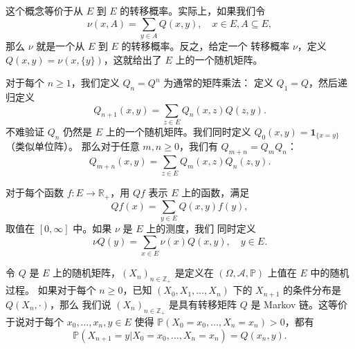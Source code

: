 \documentclass[fontset=none]{Notes}
\newcommand{\indicator}[1]{\mathbold 1_{#1}}
\begin{document}
这个概念等价于从 $E$ 到 $E$ 的转移概率。实际上，如果我们令
\[
  \nu(x,A)=\sum_{y\in A}Q(x,y),\quad x\in E,A\subseteq E,  
\]
那么 $\nu$ 就是一个从 $E$ 到 $E$ 的转移概率。反之，给定一个
转移概率 $\nu$，定义 $Q(x,y)=\nu(x,\{y\})$，这就给出了 
$E$ 上的一个随机矩阵。

对于每个 $n\geq 1$，我们定义 $Q_n=Q^n$ 为通常的矩阵乘法：
定义 $Q_1=Q$，然后递归定义
\[
  Q_{n+1}(x,y)=\sum_{z\in E}Q_n(x,z)Q(z,y).  
\]
不难验证 $Q_n$ 仍然是 $E$ 上的一个随机矩阵。我们同时定义
$Q_0(x,y)=\indicator{\{x=y\}}$（类似单位阵）。
那么对于任意 $m,n\geq 0$，我们有 $Q_{m+n}=Q_mQ_n$：
\[
  Q_{m+n}(x,y)=\sum_{z\in E}Q_m(x,z)Q_n(z,y).  
\]

对于每个函数 $f:E\to \mathbb{R}_+$，用 $Qf$ 表示 $E$
上的函数，满足
\[
  Qf(x)=\sum_{y\in E}Q(x,y)f(y),  
\]
取值在 $[0,\infty]$ 中。如果 $\nu$ 是 $E$ 上的测度，我们
同时定义
\[
  \nu Q(y)=\sum_{x\in E}\nu(x)Q(x,y),\quad y\in E.  
\]

\begin{definition}
  令 $Q$ 是 $E$ 上的随机矩阵，$(X_n)_{n\in \mathbb{Z}_+}$
  是定义在 $(\Omega,\mathcal{A},\mathbb{P})$ 上值在 $E$ 中的随机过程。
  如果对于每个 $n\geq 0$，已知 $(X_0,X_1,\dots,X_n)$ 下的
  $X_{n+1}$ 的条件分布是 $Q(X_n,\cdot)$，那么 
  我们说 $(X_n)_{n\in \mathbb{Z}_+}$ 是具有转移矩阵 $Q$
  是 Markov 链。这等价于说对于每个 $x_0,\dots,x_n,y\in E$
  使得 $\mathbb{P}(X_0=x_0,\dots,X_n=x_n)>0$，都有
  \[
    \mathbb{P}(X_{n+1}=y|X_0=x_0,\dots,X_n=x_n)=Q(x_n,y).  
  \]
\end{definition}
\end{document}
